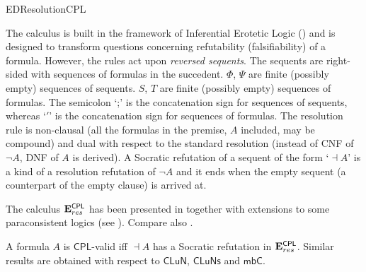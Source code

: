 \begin{entry}{EDResolutionCPL}
\begin{clarifications}
The calculus is built in the framework of Inferential Erotetic Logic (\cite{AW:2013}) and is designed to transform questions concerning refutability (falsifiability) of a formula. However, the rules act upon \textit{reversed sequents}. The sequents are right-sided with sequences of formulas in the succedent. $\Phi$, $\Psi$ are finite (possibly empty) sequences of sequents. $S$, $T$ are finite (possibly empty) sequences of formulas. The semicolon `;' is the concatenation sign for sequences of sequents, whereas `$'$' is the concatenation sign for sequences of formulas. The resolution rule is non-clausal (all the formulas in the premise, $A$ included, may be compound) and dual with respect to the standard resolution (instead of CNF of $\lnot A$, DNF of $A$ is derived). A Socratic refutation of a sequent of the form `$\dashv A$' is a kind of a resolution refutation of $\lnot A$ and it ends when the empty sequent (a counterpart of the empty clause) is arrived at.
\end{clarifications}

\begin{history}
The calculus $\mathbf{E}^\mathsf{CPL}_{res}$ has been presented in \cite{SzChDLJ:LFI} together with extensions to some paraconsistent logics (see ). Compare also .
\end{history}

\begin{technicalities}
A formula $A$ is $\mathsf{CPL}$-valid iff $\dashv A$ has a Socratic refutation in $\mathbf{E}^\mathsf{CPL}_{res}$. Similar results are obtained with respect to $\mathsf{CLuN}$, $\mathsf{CLuNs}$ and $\mathsf{mbC}$.
\end{technicalities}



%
%
%
%
%
%
% 
%




\end{entry}
